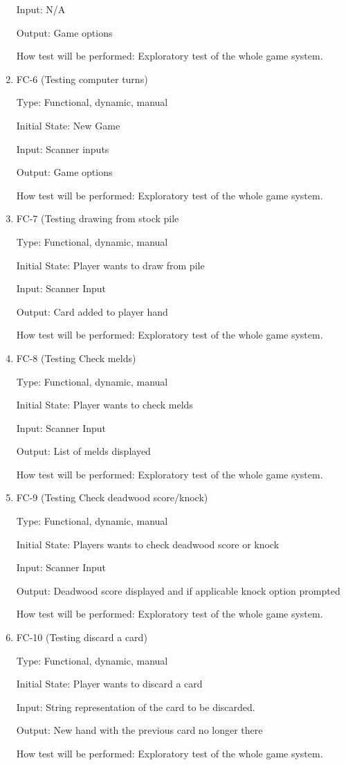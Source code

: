 \documentclass[12pt, titlepage]{article}
\begin{document}
\begin{enumerate}
Input: N/A
					
Output: Game options
					
How test will be performed: Exploratory test of the whole game system.

\item{FC-6 (Testing computer turns)}

Type: Functional, dynamic, manual
					
Initial State: New Game
					
Input: Scanner inputs
					
Output: Game options
					
How test will be performed: Exploratory test of the whole game system.

\item{FC-7 (Testing drawing from stock pile}

Type: Functional, dynamic, manual
					
Initial State: Player wants to draw from pile
					
Input: Scanner Input
					
Output: Card added to player hand
					
How test will be performed: Exploratory test of the whole game system.

\item{FC-8 (Testing Check melds)}

Type: Functional, dynamic, manual
					
Initial State: Player wants to check melds
					
Input: Scanner Input
					
Output: List of melds displayed
					
How test will be performed: Exploratory test of the whole game system.

\item{FC-9 (Testing Check deadwood score/knock)}

Type: Functional, dynamic, manual
					
Initial State: Players wants to check deadwood score or knock
					
Input: Scanner Input
					
Output: Deadwood score displayed and if applicable knock option prompted
					
How test will be performed: Exploratory test of the whole game system.

\item{FC-10 (Testing discard a card)}

Type: Functional, dynamic, manual
					
Initial State: Player wants to discard a card
					
Input: String representation of the card to be discarded.
					
Output: New hand with the previous card no longer there
					
How test will be performed: Exploratory test of the whole game system.
\end{enumerate}
\end{document}
